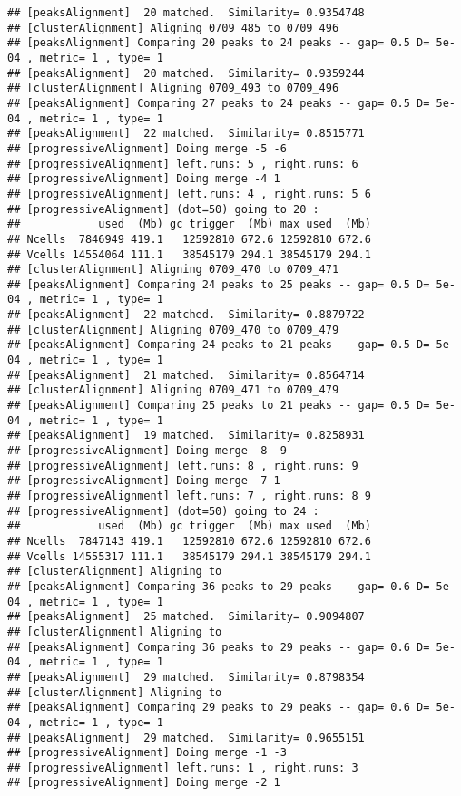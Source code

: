 \documentclass{article}\usepackage[]{graphicx}\usepackage[]{color}
\makeatletter
\newenvironment{kframe}{%
 \def\at@end@of@kframe{}%
 \ifinner\ifhmode%
  \def\at@end@of@kframe{\end{minipage}}%
  \begin{minipage}{\columnwidth}%
 \fi\fi%
 \def\FrameCommand##1{\hskip\@totalleftmargin \hskip-\fboxsep
 \colorbox{shadecolor}{##1}\hskip-\fboxsep
     \hskip-\linewidth \hskip-\@totalleftmargin \hskip\columnwidth}%
 \MakeFramed {\advance\hsize-\width
   \@totalleftmargin\z@ \linewidth\hsize
   \@setminipage}}%
 {\par\unskip\endMakeFramed%
 \at@end@of@kframe}
\newenvironment{knitrout}{}{} %
\makeatother
\begin{document}
\begin{knitrout}
\begin{kframe}
\begin{verbatim}
## [peaksAlignment]  20 matched.  Similarity= 0.9354748 
## [clusterAlignment] Aligning 0709_485 to 0709_496 
## [peaksAlignment] Comparing 20 peaks to 24 peaks -- gap= 0.5 D= 5e-04 , metric= 1 , type= 1 
## [peaksAlignment]  20 matched.  Similarity= 0.9359244 
## [clusterAlignment] Aligning 0709_493 to 0709_496 
## [peaksAlignment] Comparing 27 peaks to 24 peaks -- gap= 0.5 D= 5e-04 , metric= 1 , type= 1 
## [peaksAlignment]  22 matched.  Similarity= 0.8515771 
## [progressiveAlignment] Doing merge -5 -6 
## [progressiveAlignment] left.runs: 5 , right.runs: 6 
## [progressiveAlignment] Doing merge -4 1 
## [progressiveAlignment] left.runs: 4 , right.runs: 5 6 
## [progressiveAlignment] (dot=50) going to 20 :
##            used  (Mb) gc trigger  (Mb) max used  (Mb)
## Ncells  7846949 419.1   12592810 672.6 12592810 672.6
## Vcells 14554064 111.1   38545179 294.1 38545179 294.1
## [clusterAlignment] Aligning 0709_470 to 0709_471 
## [peaksAlignment] Comparing 24 peaks to 25 peaks -- gap= 0.5 D= 5e-04 , metric= 1 , type= 1 
## [peaksAlignment]  22 matched.  Similarity= 0.8879722 
## [clusterAlignment] Aligning 0709_470 to 0709_479 
## [peaksAlignment] Comparing 24 peaks to 21 peaks -- gap= 0.5 D= 5e-04 , metric= 1 , type= 1 
## [peaksAlignment]  21 matched.  Similarity= 0.8564714 
## [clusterAlignment] Aligning 0709_471 to 0709_479 
## [peaksAlignment] Comparing 25 peaks to 21 peaks -- gap= 0.5 D= 5e-04 , metric= 1 , type= 1 
## [peaksAlignment]  19 matched.  Similarity= 0.8258931 
## [progressiveAlignment] Doing merge -8 -9 
## [progressiveAlignment] left.runs: 8 , right.runs: 9 
## [progressiveAlignment] Doing merge -7 1 
## [progressiveAlignment] left.runs: 7 , right.runs: 8 9 
## [progressiveAlignment] (dot=50) going to 24 :
##            used  (Mb) gc trigger  (Mb) max used  (Mb)
## Ncells  7847143 419.1   12592810 672.6 12592810 672.6
## Vcells 14555317 111.1   38545179 294.1 38545179 294.1
## [clusterAlignment] Aligning to 
## [peaksAlignment] Comparing 36 peaks to 29 peaks -- gap= 0.6 D= 5e-04 , metric= 1 , type= 1 
## [peaksAlignment]  25 matched.  Similarity= 0.9094807 
## [clusterAlignment] Aligning to 
## [peaksAlignment] Comparing 36 peaks to 29 peaks -- gap= 0.6 D= 5e-04 , metric= 1 , type= 1 
## [peaksAlignment]  29 matched.  Similarity= 0.8798354 
## [clusterAlignment] Aligning to 
## [peaksAlignment] Comparing 29 peaks to 29 peaks -- gap= 0.6 D= 5e-04 , metric= 1 , type= 1 
## [peaksAlignment]  29 matched.  Similarity= 0.9655151 
## [progressiveAlignment] Doing merge -1 -3 
## [progressiveAlignment] left.runs: 1 , right.runs: 3 
## [progressiveAlignment] Doing merge -2 1 

\end{verbatim}
\end{kframe}
\end{knitrout}
\end{document}
